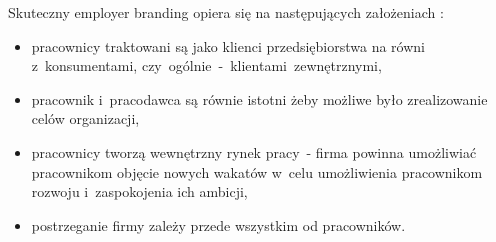 Skuteczny employer branding opiera się na następujących założeniach \cite{spychala-2019}:
\begin{itemize}
    \item pracownicy traktowani są jako klienci przedsiębiorstwa na równi z~konsumentami, czy~ogólnie~-~klientami~zewnętrznymi,
    \item pracownik i~pracodawca są równie istotni żeby możliwe było zrealizowanie celów organizacji,
    \item pracownicy tworzą wewnętrzny rynek pracy~- firma powinna umożliwiać pracownikom objęcie nowych wakatów w~celu umożliwienia pracownikom rozwoju i~zaspokojenia ich ambicji,
    \item postrzeganie firmy zależy przede wszystkim od pracowników.
\end{itemize}


